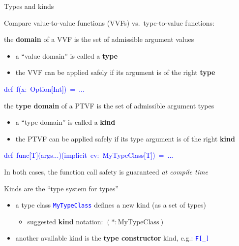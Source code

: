 \documentclass[english]{beamer}
\newenvironment{lyxcode}
   {\par\begin{list}{}{
     \setlength{\rightmargin}{\leftmargin}
     \setlength{\listparindent}{0pt}%
     \raggedright
     \setlength{\itemsep}{0pt}
     \setlength{\parsep}{0pt}
     \normalfont\ttfamily}%
    \def\{{\char`\{}
    \def\}{\char`\}}
    \def\textasciitilde{\char`\~}
    \item[]}
   {\end{list}}
\begin{document}
\begin{frame}{Types and kinds}

Compare value-to-value functions (VVFs) vs.\ type-to-value functions:
\begin{itemize}
\item the \textbf{domain} of a VVF is the set of admissible argument values
\begin{itemize}
\item a ``value domain'' is called a \textbf{type}
\item the VVF can be applied safely if its argument is of the right \textbf{type}
\end{itemize}
\begin{lyxcode}
\textcolor{blue}{\footnotesize{}def~f(x:~Option{[}Int{]})~=~...}{\footnotesize \par}
\end{lyxcode}
\item the \textbf{type domain} of a PTVF is the set of admissible argument
types
\begin{itemize}
\item a ``type domain'' is called a \textbf{kind}
\item the PTVF can be applied safely if its type argument is of the right
\textbf{kind}
\end{itemize}
\begin{lyxcode}
\textcolor{blue}{\footnotesize{}def~func{[}T{]}(args...)(implicit~ev:~MyTypeClass{[}T{]})~=~...}{\footnotesize \par}
\end{lyxcode}
\item In both cases, the function call safety is guaranteed \emph{at compile
time}
\end{itemize}
Kinds are the ``type system for types''
\begin{itemize}
\item a type class \texttt{\textcolor{blue}{\footnotesize{}MyTypeClass}}
defines a new kind (as a set of types)
\begin{itemize}
\item suggested \textbf{kind} notation:{\footnotesize{} $(*:\text{MyTypeClass})$}{\footnotesize \par}
\end{itemize}
\item another available kind is the \textbf{type constructor} kind, e.g.:
\texttt{\textcolor{blue}{\footnotesize{}F{[}\_{]}}}{\footnotesize \par}
\begin{itemize}

\end{itemize}
\end{itemize}
\end{frame}
\end{document}
